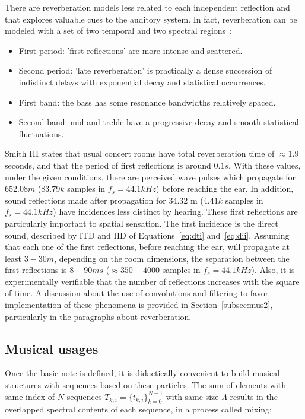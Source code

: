 There are reverberation models less related to each independent reflection and that explores valuable cues to the auditory system. In fact, reverberation can be modeled with a set of two temporal and two spectral regions~\cite{JOSPhy}:
\begin{itemize}
   \item First period: 'first reflections' are more intense and scattered.
   \item Second period: 'late reverberation' is practically a dense succession of indistinct delays with exponential decay and statistical occurrences.
   \item First band: the bass has some resonance bandwidths relatively spaced.
   \item Second band: mid and treble have a progressive decay and smooth statistical fluctuations.
\end{itemize}

Smith III states that usual concert rooms have total reverberation time of $\approx 1.9$ seconds, and that the period of first reflections is around $0.1s$. With these values, under the given conditions, there are perceived wave pulses which propagate for $652.08m$ ($83.79k$ samples in $f_s=44.1kHz$) before reaching the ear. In addition, sound reflections made after propagation for $34.32$ m ($4.41k$ samples in $f_s=44.1kHz$) have incidences less distinct by hearing. These first reflections are particularly important to spatial sensation. The first incidence is the direct sound, described by ITD and IID of Equations~\ref{eq:dti} and~\ref{eq:dii}. Assuming that each one of the first reflections, before reaching the ear, will propagate at least $3-30m$, depending on the room dimensions, the separation between the first reflections is $8-90ms$ ($\approx 350-4000$ samples in $f_s=44.1kHz$).
Also, it is experimentally verifiable that the number of reflections increases with the square of time.
A discussion about the use of convolutions and filtering to favor implementation of these phenomena is provided in Section~\ref{subsec:mus2}, particularly in the paragraphs about reverberation.

\subsection{Musical usages}\label{subsec:basMus}
Once the basic note is defined, it is didactically convenient to build musical structures with sequences based on these particles. The sum of elements with same index of $N$ sequences $T_{k,i}=\{t_{k,i}\}_{k=0}^{N-1}$ with same size $\Lambda$ results in the overlapped spectral contents of each sequence, in a process called mixing:

